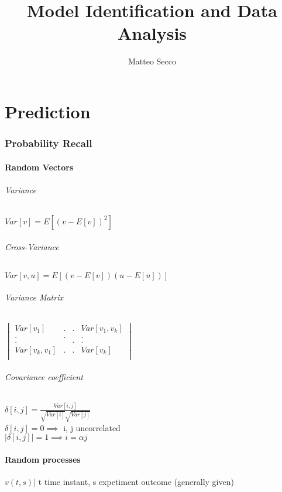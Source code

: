 \documentclass{article}
\title{Model Identification and Data Analysis}
\author{Matteo Secco}
\let\OldPart\part
\renewcommand{\part}{\newpage\OldPart}
\begin{document}
\maketitle
\newpage
\tableofcontents
\newpage

\part{Prediction}
\section{Probability Recall}

\subsection{Random Vectors}

\paragraph{Variance}
$Var[v]=E[(v-E[v])^2]$
\paragraph{Cross-Variance}
$Var[v,u]=E[(v-E[v])(u-E[u])]$
\paragraph{Variance Matrix}
$\begin{vmatrix}
	Var[v_1]			&	.	&	.	&	Var[v_1,v_k]		\\
		.			&	.	&		&		.			\\
		.			&		&	.	&		.			\\
	Var[v_k,v_1]		&	.	&	.	&	Var[v_k]			\\
				
\end{vmatrix}$
\paragraph{Covariance coefficient}
	$\delta[i,j]=\frac{Var[i,j]}{\sqrt{Var[i]}\sqrt{Var[j]}}$\\
	$\delta[i,j]=0 \implies$ i, j uncorrelated\\
	$\left|\delta[i,j]\right|=1 \implies i=\alpha j$
	
\subsection{Random processes} $v(t,s) |$ t time instant, s expetiment outcome (generally given)
\end{document}
